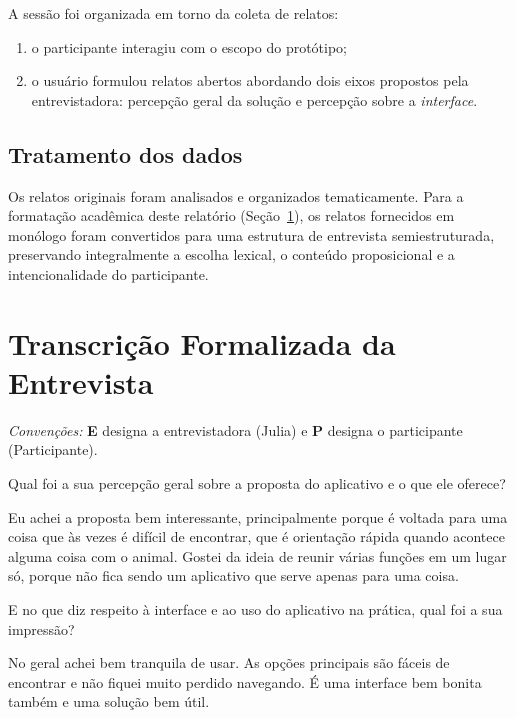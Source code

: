 \documentclass[12pt,a4paper]{article}
\newenvironment{turnos}
  {\begin{list}{}{%
     \setlength{\leftmargin}{2.2cm}%
     \setlength{\labelwidth}{2.0cm}%
     \setlength{\labelsep}{0.2cm}%
     \setlength{\itemsep}{0.6em}%
     \setlength{\parsep}{0pt}}}
  {\end{list}}
\newcommand{\fala}[1]{\item[\textbf{#1}\hfill]}
\newcommand{\entrevistador}{Julia}
\newcommand{\participante}{Participante}
\begin{document}
A sessão foi organizada em torno da coleta de relatos:
\begin{enumerate}[label=\textbf{\arabic*.}]
  \item o participante interagiu com o escopo do protótipo;
  \item o usuário formulou relatos abertos abordando dois eixos propostos pela entrevistadora: percepção geral da solução e percepção sobre a \textit{interface}.
\end{enumerate}

\subsection{Tratamento dos dados}

Os relatos originais foram analisados e organizados tematicamente. Para a formatação acadêmica deste relatório (Seção~\ref{sec:transcricao}), os relatos fornecidos em monólogo foram convertidos para uma estrutura de entrevista semiestruturada, preservando integralmente a escolha lexical, o conteúdo proposicional e a intencionalidade do participante.

\section{Transcrição Formalizada da Entrevista}
\label{sec:transcricao}

\noindent\textit{Convenções:} \textbf{E} designa a entrevistadora (\entrevistador{}) e \textbf{P} designa o participante (\participante{}). 

\begin{turnos}

\fala{E:} Qual foi a sua percepção geral sobre a proposta do aplicativo e o que ele oferece?

\fala{P:} Eu achei a proposta bem interessante, principalmente porque é voltada para uma coisa que às vezes é difícil de encontrar, que é orientação rápida quando acontece alguma coisa com o animal. Gostei da ideia de reunir várias funções em um lugar só, porque não fica sendo um aplicativo que serve apenas para uma coisa.

\fala{E:} E no que diz respeito à interface e ao uso do aplicativo na prática, qual foi a sua impressão?

\fala{P:} No geral achei bem tranquila de usar. As opções principais são fáceis de encontrar e não fiquei muito perdido navegando. É uma interface bem bonita também e uma solução bem útil.

\end{turnos}
\end{document}
